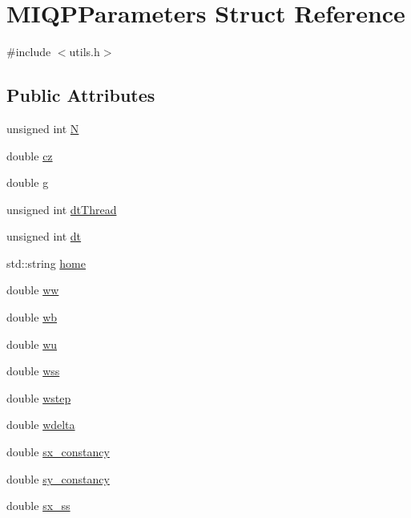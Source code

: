 \hypertarget{structMIQPParameters}{\section{\-M\-I\-Q\-P\-Parameters \-Struct \-Reference}
\label{structMIQPParameters}
}


{\ttfamily \#include $<$utils.\-h$>$}

\subsection*{\-Public \-Attributes}
\begin{DoxyCompactItemize}
\item 
unsigned int \hyperlink{structMIQPParameters_a7545bc29708292cbfca22b0446180f7c}{\-N}
\item 
double \hyperlink{structMIQPParameters_ab8158e2bf119d70c9856b6a277e3c42a}{cz}
\item 
double \hyperlink{structMIQPParameters_a31eca71d200b5b1468bd60b3266d0688}{g}
\item 
unsigned int \hyperlink{structMIQPParameters_a7f5403de83b908d6ce34ce41a1327d62}{dt\-Thread}
\item 
unsigned int \hyperlink{structMIQPParameters_ab4fca30503423e047dc55d27f0c9f3c9}{dt}
\item 
std\-::string \hyperlink{structMIQPParameters_a351843e2933021d2ed3abb00a9d001ff}{home}
\item 
double \hyperlink{structMIQPParameters_a7223a1cda1e4565d18729f1e7bba87e0}{ww}
\item 
double \hyperlink{structMIQPParameters_a6bc828e6060bfd69c3d6353a460de86b}{wb}
\item 
double \hyperlink{structMIQPParameters_aed141afdcc25904d53526a5f2c977427}{wu}
\item 
double \hyperlink{structMIQPParameters_a317395e51ff98506316b9a63cf03d48f}{wss}
\item 
double \hyperlink{structMIQPParameters_a284df9b565513a826e92098f0a23f5cc}{wstep}
\item 
double \hyperlink{structMIQPParameters_ac13ff21321154d5cebba21855ac8357f}{wdelta}
\item 
double \hyperlink{structMIQPParameters_ae7f08901a6a4bd6850cf232496d1c231}{sx\-\_\-constancy}
\item 
double \hyperlink{structMIQPParameters_a1dd5e07b3f05ddf30ecbe878caf4de38}{sy\-\_\-constancy}
\item 
double \hyperlink{structMIQPParameters_af8a016a12ecffd0751307c7d869472e9}{sx\-\_\-ss}

\end{DoxyCompactItemize}
